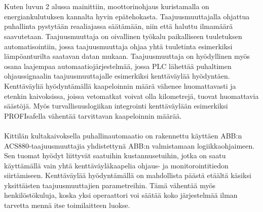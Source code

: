 \documentclass[finnish,12pt,a4paper,pdftex,elec,utf8]{aaltothesis}
\begin{document}
\\\\
Kuten luvun 2 alussa mainittiin, moottorinohjaus kuristamalla on energiankulutuksen kannalta hyvin epätehokasta. Taajuusmuuttajalla ohjattua puhallinta pystytään reaaliajassa säätämään, niin että haluttu ilmamäärä saavutetaan. Taajuusmuuttaja on oivallinen työkalu paikalliseen tuuletuksen automatisointiin, jossa taajuusmuuttaja ohjaa yhtä tuuletinta esimerkiksi lämpöanturilta saatavan datan mukaan. Taajuusmuuttaja on hyödyllinen myös osana laajempaa automaatiojärjestelmää, jossa PLC lähettää puhaltimen ohjaussignaalin taajuusmuuttajalle esimerkiksi kenttäväylää hyödyntäen. Kenttäväyliä hyödyntämällä kaapeloinnin määrä vähenee huomattavasti ja etenkin kaivoksissa, joissa vetomatkat voivat olla kilometrejä, tuovat huomattavia säästöjä. Myös turvallisuuslogiikan integrointi kenttäväylään esimerkiksi PROFIsafella vähentää tarvittavan kaapeloinnin määrää.
\\\\
Kittilän kultakaivoksella puhallinautomaatio on rakennettu käyttäen ABB:n ACS880-taajuusmuuttajia yhdistettynä ABB:n valmistamaan logiikkaohjaimeen. Sen tuomat hyödyt liittyvät saatuihin kustannusetuihin, jotka on saatu käyttämällä vain yhtä kenttäväyläkaapelia ohjaus- ja monitorointitiedon siirtämiseen. \cite{MyyntiHaastattelu} Kenttäväylää hyödyntämällä on mahdollista päästä etäältä käsiksi yksittäisten taajuusmuuttajien parametreihin. Tämä vähentää myös henkilöstökuluja, koska yksi operaattori voi säätää koko järjestelmää ilman tarvetta mennä itse toimilaitteen luokse.

\end{document}
